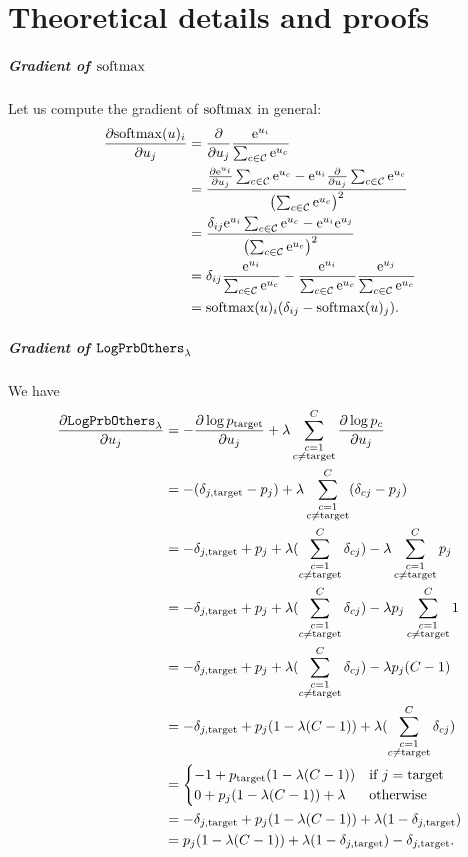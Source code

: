\documentclass[../main.tex]{subfiles}
\begin{document}
\chapter{Theoretical details and proofs}
\label{ch:proofs}

\paragraph{Gradient of $\softmax$}
\label{eq:grad_softmax}

Let us compute the gradient of $\softmax$ in general:
\begin{align*}
    \grad{\softmax(u)_i}{u_j}
     & = \grad{}{u_j} \frac{\eu{i}}{\seu}                                                 \\
     & = \frac{\grad{\eu{i}}{u_j} \seu - \eu{i} \grad{}{u_j} \seu}{\left( \seu \right)^2} \\
     & = \frac{\dij \eu{i} \seu - \eu{i} \eu{j}}{\left(\seu \right)^{2}}                  \\
     & = \dij \frac{\eu{i}}{\seu} - \frac{\eu{i}}{\seu} \frac{\eu{j}}{\seu}               \\
     & = \softmax(u)_i ( \dij  -  \softmax(u)_j).
\end{align*}

\paragraph{Gradient of $\LogPrbOthers{\lambda}$}
\label{eq:grad_log_prb_others}

We have
\begin{align*}
    \grad{\LogPrbOthers{\lambda}}{u_j}
     & = - \grad{\log p_\target}{u_j} + \lambda \mysum{c}\grad{\log p_c}{u_j}          \\
     & = - (\djt - p_j) + \lambda \mysum{c} (\delta_{cj} - p_j)                        \\
     & = - \djt + p_j + \lambda (\mysum{c} \delta_{cj}) - \lambda \mysum{c} p_j        \\
     & = - \djt + p_j + \lambda (\mysum{c} \delta_{cj}) - \lambda p_j \mysum{c} 1      \\
     & = - \djt + p_j + \lambda (\mysum{c} \delta_{cj}) - \lambda p_j (\outputdim - 1) \\
     & = - \djt + p_j (1 - \lambda (\outputdim - 1)) + \lambda (\mysum{c} \delta_{cj}) \\
     & = \begin{cases}
             - 1 + p_\target (1 - \lambda (\outputdim - 1))   & \text{if } j = \target \\
             0 + p_j (1 - \lambda (\outputdim - 1)) + \lambda & \text{otherwise}
         \end{cases}     \\
     & = - \djt + p_j (1 - \lambda (\outputdim - 1)) + \lambda (1 - \djt)              \\
     & = p_j (1 - \lambda (\outputdim - 1)) + \lambda (1 - \djt) - \djt.
\end{align*}
\end{document}
